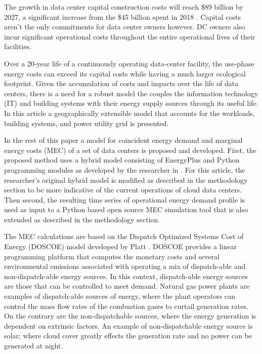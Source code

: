 The growth in data center capital construction costs will reach \$89 billion by 2027, a significant increase from the \$45 billion spent in 2018 \citep{dcmarket19}. Capital costs aren’t the only commitments for data center owners however. DC owner\textsc{}s also incur significant operational costs throughout the entire operational lives of their facilities.  

Over a 20-year life of a continuously operating data-center facility, the use-phase energy costs can exceed its capital costs while having a much larger ecological footprint. Given the accumulation of costs and impacts over the life of data centers, there is a need for a robust model the couples the information technology (IT) and building systems with their energy supply sources through its useful life. In this article a geographically extensible model that accounts for the workloads, building systems, and power utility grid is presented.

In the rest of this paper a model for coincident energy demand and marginal energy costs (MEC) of a set of data centers is proposed and developed. First, the proposed method uses a hybrid model consisting of EnergyPlus and Python programming modules as developed by the researcher in \citep{kumar20}. For this article, the researcher's original hybrid model is modified as described in the methodology section to be more indicative of the current operations of cloud data centers. Then second, the resulting time series of operational energy demand profile is used as input to a Python based open source MEC simulation tool that is also extended as described in the methodology section.  

The MEC calculations are based on the Dispatch Optimized Systems Cost of Energy (DOSCOE) model developed by Platt \citep{platt17}. DOSCOE provides a linear programming platform that computes the monetary costs and several environmental emissions associated with operating a mix of dispatch-able and non-dispatch-able energy sources. In this context, dispatch-able energy sources are those that can be controlled to meet demand. Natural gas power plants are examples of dispatch-able sources of energy, where the plant operators can control the mass flow rates of the combustion gases to curtail generation rates. On the contrary are the non-dispatchable sources, where the energy generation is dependent on extrinsic factors. An example of non-dispatchable energy source is solar; where cloud cover greatly effects the generation rate and no power can be generated at night.

